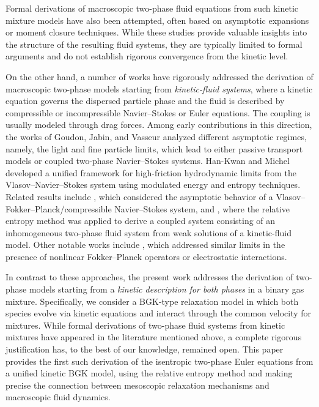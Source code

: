 \documentclass[10pt,reqno]{amsart}
\numberwithin{equation}{section}
\begin{document}
Formal derivations of macroscopic two-phase fluid equations from such kinetic mixture models have also been attempted, often based on asymptotic expansions or moment closure techniques. While these studies provide valuable insights into the structure of the resulting fluid systems, they are typically limited to formal arguments and do not establish rigorous convergence from the kinetic level.

On the other hand, a number of works have rigorously addressed the derivation of macroscopic two-phase models starting from \emph{kinetic-fluid systems}, where a kinetic equation governs the dispersed particle phase and the fluid is described by compressible or incompressible Navier--Stokes or Euler equations. The coupling is usually modeled through drag forces. Among early contributions in this direction, the works of Goudon, Jabin, and Vasseur \cite{GJV04a,GJV04b} analyzed different asymptotic regimes, namely, the light and fine particle limits, which lead to either passive transport models or coupled two-phase Navier--Stokes systems. Han-Kwan and Michel \cite{HKM24} developed a unified framework for high-friction hydrodynamic limits from the Vlasov--Navier--Stokes system using modulated energy and entropy techniques. Related results include \cite{MV08}, which considered the asymptotic behavior of a Vlasov--Fokker--Planck/compressible Navier--Stokes system, and \cite{SWYZ23}, where the relative entropy method was applied to derive a coupled system consisting of an inhomogeneous two-phase fluid system from weak solutions of a kinetic-fluid model. Other notable works include \cite{CCK16,CG06,CJ21,CJ23}, which addressed similar limits in the presence of nonlinear Fokker--Planck operators or electrostatic interactions.

In contrast to these approaches, the present work addresses the derivation of two-phase models starting from a  \emph{kinetic description for both phases} in a binary gas mixture. Specifically, we consider a BGK-type relaxation model in which both species evolve via kinetic equations and interact through the common velocity for mixtures. While formal derivations of two-phase fluid systems from kinetic mixtures have appeared in the literature mentioned above, a complete rigorous justification has, to the best of our knowledge, remained open. This paper provides the first such derivation of the isentropic two-phase Euler equations from a unified kinetic BGK model, using the relative entropy method and making precise the connection between mesoscopic relaxation mechanisms and macroscopic fluid dynamics.
\end{document}
